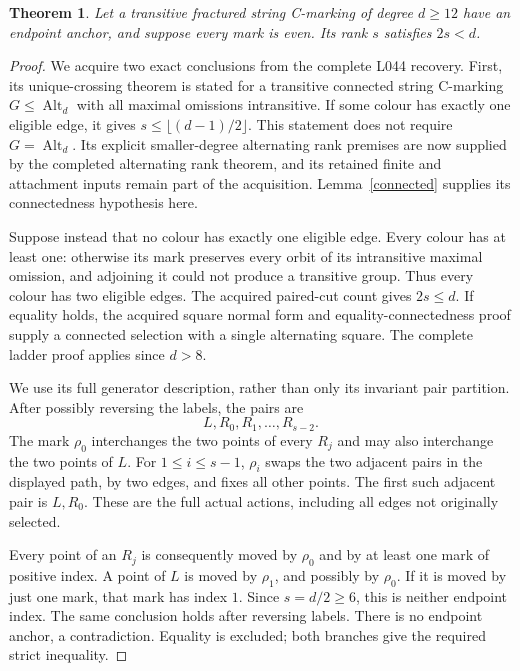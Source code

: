 \documentclass[11pt,a4paper]{article}
\newtheorem{theorem}[lemma]{Theorem}
\newcommand{\Alt}{\operatorname{Alt}}
\begin{document}
\begin{theorem}\label{even}
Let a transitive fractured string C-marking of degree $d\ge12$
have an endpoint anchor, and suppose every mark is even.
Its rank $s$ satisfies $2s<d$.
\end{theorem}
\begin{proof}
We acquire two exact conclusions from the complete L044 recovery.
First, its unique-crossing theorem is stated for a transitive
connected string C-marking $G\le\Alt_d$ with all maximal omissions
intransitive. If some colour has exactly one eligible edge, it gives
$s\le\lfloor(d-1)/2\rfloor$. This statement does not require
$G=\Alt_d$. Its explicit smaller-degree alternating rank premises
are now supplied by the completed alternating rank theorem, and its
retained finite and attachment inputs remain part of the acquisition.
Lemma~\ref{connected} supplies its connectedness hypothesis here.

Suppose instead that no colour has exactly one eligible edge. Every
colour has at least one: otherwise its mark preserves every orbit
of its intransitive maximal omission, and adjoining it could not
produce a transitive group. Thus every colour has two eligible edges.
The acquired paired-cut count gives $2s\le d$. If equality holds,
the acquired square normal form and equality-connectedness proof
supply a connected selection with a single alternating square.
The complete ladder proof applies since $d>8$.

We use its full generator description, rather than only its invariant
pair partition. After possibly reversing the labels, the pairs are
\[
                    L,R_0,R_1,\ldots,R_{s-2}.
\]
The mark $\rho_0$ interchanges the two points of every $R_j$ and
may also interchange the two points of $L$. For $1\le i\le s-1$,
$\rho_i$ swaps the two adjacent pairs in the displayed path, by
two edges, and fixes all other points. The first such adjacent pair
is $L,R_0$. These are the full actual actions, including all edges
not originally selected.

Every point of an $R_j$ is consequently moved by $\rho_0$ and by
at least one mark of positive index. A point of $L$ is moved by
$\rho_1$, and possibly by $\rho_0$. If it is moved by just one
mark, that mark has index $1$. Since $s=d/2\ge6$, this is neither
endpoint index. The same conclusion holds after reversing labels.
There is no endpoint anchor, a contradiction. Equality is excluded;
both branches give the required strict inequality.
\end{proof}
\end{document}
